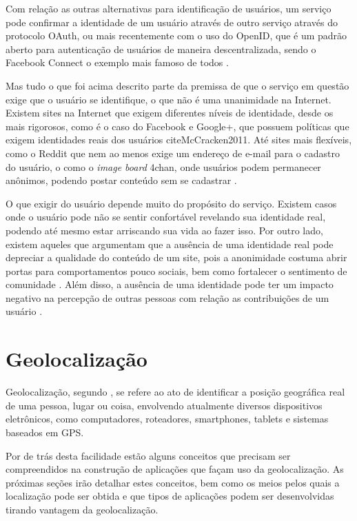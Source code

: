 \documentclass[diss]{template/setrem}
\begin{document}
Com relação as outras alternativas para identificação de usuários, um serviço pode confirmar a identidade de um usuário através de outro serviço através do protocolo OAuth, ou mais recentemente com o uso do OpenID, que é um padrão aberto para autenticação de usuários de maneira descentralizada, sendo o Facebook Connect o exemplo mais famoso de todos \citep{Eldon2009}.

Mas tudo o que foi acima descrito parte da premissa de que o serviço em questão exige que o usuário se identifique, o que não é uma unanimidade na Internet. Existem sites na Internet que exigem diferentes níveis de identidade, desde os mais rigorosos, como é o caso do Facebook e Google+, que possuem políticas que exigem identidades reais dos usuários cite{McCracken2011}. Até sites mais flexíveis, como o Reddit que nem ao menos exige um endereço de e-mail para o cadastro do usuário, o como o \emph{image board} 4chan, onde usuários podem permanecer anônimos, podendo postar conteúdo sem se cadastrar \citep{Bernstein2011}.

O que exigir do usuário depende muito do propósito do serviço. Existem casos onde o usuário pode não se sentir confortável revelando sua identidade real, podendo até mesmo estar arriscando sua vida ao fazer isso. Por outro lado, existem aqueles que argumentam que a ausência de uma identidade real pode depreciar a qualidade do conteúdo de um site, pois a anonimidade costuma abrir portas para comportamentos pouco sociais, bem como fortalecer o sentimento de comunidade \citep{Bernstein2011}. Além disso, a ausência de uma identidade pode ter um impacto negativo na percepção de outras pessoas com relação as contribuições de um usuário \citep{Rains2007}.

\section{Geolocalização}
Geolocalização, segundo \citet{Holdener2011}, se refere ao ato de identificar a posição geográfica real de uma pessoa, lugar ou coisa, envolvendo atualmente diversos dispositivos eletrônicos, como computadores, roteadores, smartphones, tablets e sistemas baseados em GPS.

Por de trás desta facilidade estão alguns conceitos que precisam ser compreendidos na construção de aplicações que façam uso da geolocalização. As próximas seções irão detalhar estes conceitos, bem como os 
meios pelos quais a localização pode ser obtida e que tipos de aplicações podem ser desenvolvidas tirando vantagem da geolocalização.
\end{document}
